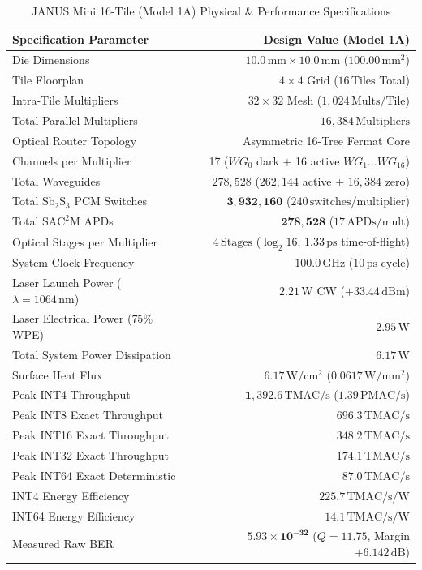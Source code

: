 \documentclass[journal]{IEEEtran}
\begin{document}
\begin{table}[!htbp]
\centering
\footnotesize
\caption{JANUS Mini 16-Tile (Model 1A) Physical \& Performance Specifications}
\label{tab:model_1a_specs}
\begin{tabularx}{\columnwidth}{>{\raggedright\arraybackslash}X r}
\toprule
\textbf{Specification Parameter} & \textbf{Design Value (Model 1A)} \\
\midrule
Die Dimensions & $10.0\,\mathrm{mm} \times 10.0\,\mathrm{mm}$ ($100.00\,\mathrm{mm^2}$) \\
Tile Floorplan & $4 \times 4$ Grid ($16\,\mathrm{Tiles}$ Total) \\
Intra-Tile Multipliers & $32 \times 32$ Mesh ($1,024\,\mathrm{Mults/Tile}$) \\
Total Parallel Multipliers & $16,384\,\mathrm{Multipliers}$ \\
Optical Router Topology & Asymmetric 16-Tree Fermat Core \\
Channels per Multiplier & 17 ($WG_0$ dark + 16 active $WG_1 \dots WG_{16}$) \\
Total Waveguides & $278,528$ ($262,144$ active + $16,384$ zero) \\
Total $\mathrm{Sb_2S_3}$ PCM Switches & $\mathbf{3,932,160}$ ($240\,\mathrm{switches/multiplier}$) \\
Total $\mathrm{SAC^2M}$ APDs & $\mathbf{278,528}$ ($17\,\mathrm{APDs/mult}$) \\
Optical Stages per Multiplier & $4\,\mathrm{Stages}$ ($\log_2 16$, $1.33\,\mathrm{ps}$ time-of-flight) \\
System Clock Frequency & $100.0\,\mathrm{GHz}$ ($10\,\mathrm{ps}$ cycle) \\
Laser Launch Power ($\lambda=1064\,\mathrm{nm}$) & $2.21\,\mathrm{W}$ CW ($+33.44\,\mathrm{dBm}$) \\
Laser Electrical Power ($75\%$ WPE) & $2.95\,\mathrm{W}$ \\
Total System Power Dissipation & $\mathbf{6.17\,\mathrm{W}}$ \\
Surface Heat Flux & $6.17\,\mathrm{W/cm^2}$ ($0.0617\,\mathrm{W/mm^2}$) \\
\midrule
Peak INT4 Throughput & $\mathbf{1,392.6\,\mathrm{TMAC/s}}$ ($1.39\,\mathrm{PMAC/s}$) \\
Peak INT8 Exact Throughput & $696.3\,\mathrm{TMAC/s}$ \\
Peak INT16 Exact Throughput & $348.2\,\mathrm{TMAC/s}$ \\
Peak INT32 Exact Throughput & $174.1\,\mathrm{TMAC/s}$ \\
Peak INT64 Exact Deterministic & $\mathbf{87.0\,\mathrm{TMAC/s}}$ \\
\midrule
INT4 Energy Efficiency & $\mathbf{225.7\,\mathrm{TMAC/s/W}}$ \\
INT64 Energy Efficiency & $\mathbf{14.1\,\mathrm{TMAC/s/W}}$ \\
Measured Raw BER & $\mathbf{5.93 \times 10^{-32}}$ ($Q = 11.75$, Margin $+6.142\,\mathrm{dB}$) \\
\bottomrule
\end{tabularx}
\end{table}
\end{document}
